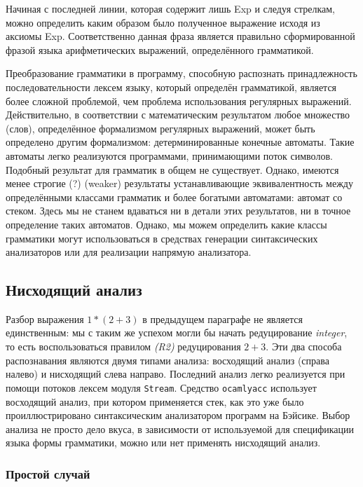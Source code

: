 Начиная с последней линии, которая содержит лишь Exp и следуя стрелкам, можно
определить каким образом было полученное выражение исходя из аксиомы Exp.
Соответственно данная фраза является правильно сформированной фразой языка
арифметических выражений, определённого грамматикой.

Преобразование грамматики в программу, способную распознать принадлежность
последовательности лексем языку, который определён грамматикой, является более
сложной проблемой, чем проблема использования регулярных выражений.
Действительно, в соответствии с математическим результатом любое множество
(слов), определённое формализмом регулярных выражений, может быть определено
другим формализмом: детерминированные конечные автоматы. Такие автоматы легко
реализуются программами, принимающими поток символов. Подобный результат для
грамматик в общем не существует. Однако, имеются менее строгие (?) (weaker)
результаты устанавливающие эквивалентность между определёнными классами
грамматик и более богатыми автоматами: автомат со стеком. Здесь мы не станем
вдаваться ни в детали этих результатов, ни в точное определение таких автоматов.
Однако, мы можем определить какие классы грамматики могут использоваться в
средствах генерации синтаксических анализаторов или для реализации напрямую
анализатора.

\subsection{Нисходящий анализ}

Разбор выражения $1 * (2 + 3)$ в предыдущем параграфе не является единственным:
мы с таким же успехом могли бы начать редуцирование {\it integer}, то есть
воспользоваться правилом {\it (R2)} редуцирования $2 + 3$. Эти два способа
распознавания являются двумя типами анализа: восходящий анализ (справа налево) и
нисходящий слева направо. Последний анализ легко реализуется при помощи потоков
лексем модуля \texttt{Stream}. Средство \texttt{ocamlyacc} использует восходящий
анализ, при котором применяется стек, как это уже было проиллюстрировано
синтаксическим анализатором программ на Бэйсике. Выбор анализа не просто дело
вкуса, в зависимости от используемой для спецификации языка формы грамматики,
можно или нет применять нисходящий анализ.

\subsubsection{Простой случай}


